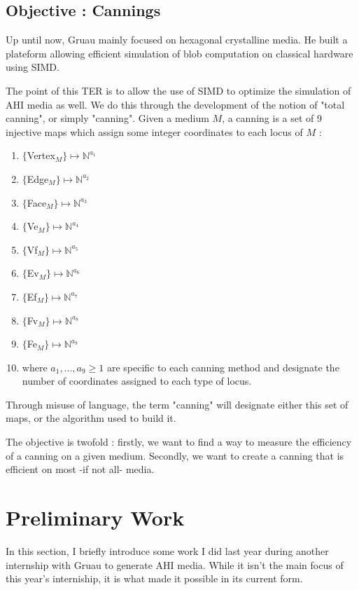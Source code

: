 \documentclass{article}
\begin{document}
\subsection{Objective : Cannings}

Up until now, Gruau mainly focused on hexagonal crystalline media. He built a plateform allowing efficient simulation of blob computation on classical hardware using SIMD\supercite{Voronoi, platform_CA2}. 

The point of this TER is to allow the use of SIMD to optimize the simulation of AHI media as well. We do this through the development of the notion of "total canning", or simply "canning". Given a medium $M$, a canning is a set of 9 injective maps which assign some integer coordinates to each locus of $M$ :
\begin{enumerate}
	\item $\{$Vertex$_M\} \mapsto \mathbb{N}^{a_1}$
	\item $\{$Edge$_M\} \mapsto \mathbb{N}^{a_2}$
	\item $\{$Face$_M\} \mapsto \mathbb{N}^{a_3}$
	\item $\{$Ve$_M\} \mapsto \mathbb{N}^{a_4}$
	\item $\{$Vf$_M\} \mapsto \mathbb{N}^{a_5}$
	\item $\{$Ev$_M\} \mapsto \mathbb{N}^{a_6}$
	\item $\{$Ef$_M\} \mapsto \mathbb{N}^{a_7}$
	\item $\{$Fv$_M\} \mapsto \mathbb{N}^{a_8}$
	\item $\{$Fe$_M\} \mapsto \mathbb{N}^{a_9}$
	\item[] where $a_1, ..., a_9 \geq 1$ are specific to each canning method and designate the number of coordinates assigned to each type of locus.
\end{enumerate}
Through misuse of language, the term "canning" will designate either this set of maps, or the algorithm used to build it.

The objective is twofold : firstly, we want to find a way to measure the efficiency of a canning on a given medium. Secondly, we want to create a canning that is efficient on most -if not all- media.

\section{Preliminary Work}

In this section, I briefly introduce some work I did last year during another internship with Gruau to generate AHI media. While it isn't the main focus of this year's interniship, it is what made it possible in its current form.
\end{document}
